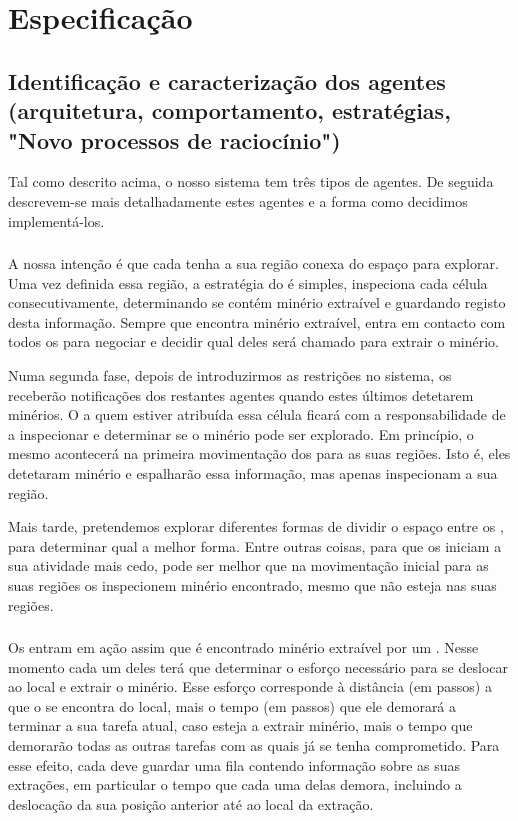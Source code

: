 \documentclass[12pt]{report}
\begin{document}
\chapter{Especificação}

\section{Identificação e caracterização dos agentes (arquitetura, comportamento, estratégias, "Novo processos de raciocínio")}
Tal como descrito acima, o nosso sistema tem três tipos de agentes. De seguida descrevem-se mais detalhadamente estes agentes e a forma como decidimos implementá-los.

\subsection{\Spotter}
A nossa intenção é que cada \spotter tenha a sua região conexa do espaço para explorar. Uma vez definida essa região, a estratégia do \Spotter é simples, inspeciona cada célula consecutivamente, determinando se contém minério extraível e guardando registo desta informação. Sempre que encontra minério extraível, entra em contacto com todos os \producers para negociar e decidir qual deles será chamado para extrair o minério.

Numa segunda fase, depois de introduzirmos as restrições no sistema, os \spotters receberão notificações dos restantes agentes quando estes últimos detetarem minérios. O \spotter a quem estiver atribuída essa célula ficará com a responsabilidade de a inspecionar e determinar se o minério pode ser explorado. Em princípio, o mesmo acontecerá na primeira movimentação dos \spotters para as suas regiões. Isto é, eles detetaram minério e espalharão essa informação, mas apenas inspecionam a sua região.

Mais tarde, pretendemos explorar diferentes formas de dividir o espaço entre os \spotters, para determinar qual a melhor forma. Entre outras coisas, para que os \producers iniciam a sua atividade mais cedo, pode ser melhor que na movimentação inicial para as suas regiões os \spotters inspecionem minério encontrado, mesmo que não esteja nas suas regiões.

\subsection{\Producer}
Os \producers entram em ação assim que é encontrado minério extraível por um \spotter. Nesse momento cada um deles terá que determinar o esforço necessário para se deslocar ao local e extrair o minério. Esse esforço corresponde à distância (em passos) a que o \producer se encontra do local, mais o tempo (em passos) que ele demorará a terminar a sua tarefa atual, caso esteja a extrair minério, mais o tempo que demorarão todas as outras tarefas com as quais já se tenha comprometido. Para esse efeito, cada \producer deve guardar uma fila contendo informação sobre as suas extrações, em particular o tempo que cada uma delas demora, incluindo a deslocação da sua posição anterior até ao local da extração.
\end{document}
